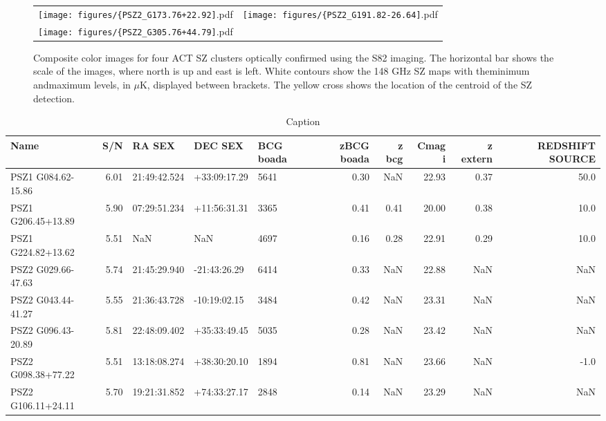 \documentclass[apj, revtex4-1]{emulateapj}
\begin{document}
\begin{figure}
	\centering
	\begin{tabular}{cc}
		\texttt{[image: figures/\{PSZ2\_G173.76+22.92]}.pdf}&
		\texttt{[image: figures/\{PSZ2\_G191.82-26.64]}.pdf}\\
		\texttt{[image: figures/\{PSZ2\_G305.76+44.79]}.pdf}&
	\end{tabular}
	\caption{Composite color images for four ACT SZ clusters optically confirmed using the S82 imaging. The horizontal bar shows the scale of the images, where north is up and east is left. White contours show the 148 GHz SZ maps with theminimum andmaximum levels, in $\mu$K, displayed between brackets. The yellow cross shows the location of the centroid of the SZ detection.}
\end{figure}

\begin{table}
	\caption[Caption]{Caption}
	\begin{tabular}{lrlllrrrrr}
	\hline
	 Name &  S/N &        RA SEX &       DEC SEX & BCG boada &  zBCG boada &  z bcg &  Cmag i &  z extern &  REDSHIFT SOURCE \\
	\hline
 PSZ1 G084.62-15.86 & 6.01 &  21:49:42.524 &  +33:09:17.29 &      5641 &        0.30 &    NaN &   22.93 &      0.37 &             50.0 \\
 PSZ1 G206.45+13.89 & 5.90 &  07:29:51.234 &  +11:56:31.31 &      3365 &        0.41 &   0.41 &   20.00 &      0.38 &             10.0 \\
 PSZ1 G224.82+13.62 & 5.51 &           NaN &           NaN &      4697 &        0.16 &   0.28 &   22.91 &      0.29 &             10.0 \\
 PSZ2 G029.66-47.63 & 5.74 &  21:45:29.940 &  -21:43:26.29 &      6414 &        0.33 &    NaN &   22.88 &       NaN &              NaN \\
 PSZ2 G043.44-41.27 & 5.55 &  21:36:43.728 &  -10:19:02.15 &      3484 &        0.42 &    NaN &   23.31 &       NaN &              NaN \\
 PSZ2 G096.43-20.89 & 5.81 &  22:48:09.402 &  +35:33:49.45 &      5035 &        0.28 &    NaN &   23.42 &       NaN &              NaN \\
 PSZ2 G098.38+77.22 & 5.51 &  13:18:08.274 &  +38:30:20.10 &      1894 &        0.81 &    NaN &   23.66 &       NaN &             -1.0 \\
 PSZ2 G106.11+24.11 & 5.70 &  19:21:31.852 &  +74:33:27.17 &      2848 &        0.14 &    NaN &   23.29 &       NaN &              NaN \\

\end{tabular}
\end{table}
\end{document}
